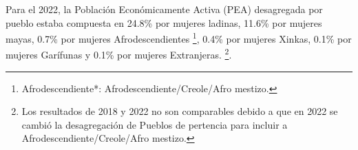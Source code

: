 Para el 2022, la Población Económicamente Activa (PEA) desagregada por pueblo estaba compuesta en 24.8\% por mujeres ladinas, 11.6\% por mujeres mayas, 0.7\% por mujeres Afrodescendientes \footnote{Afrodescendiente*: Afrodescendiente/Creole/Afro mestizo.}, 0.4\% por mujeres Xinkas, 0.1\% por mujeres Garífunas y 0.1\% por mujeres Extranjeras. \footnote{Los resultados de 2018 y 2022 no son comparables debido a que en 2022 se cambió la desagregación de Pueblos de pertencia para incluir a Afrodescendiente/Creole/Afro mestizo.}.
